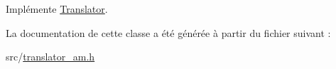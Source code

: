 Implémente \hyperlink{class_translator_a31e719b4e290a359ddbb78132bf3f494}{Translator}.



La documentation de cette classe a été générée à partir du fichier suivant \+:\begin{DoxyCompactItemize}
\item 
src/\hyperlink{translator__am_8h}{translator\+\_\+am.\+h}\end{DoxyCompactItemize}
